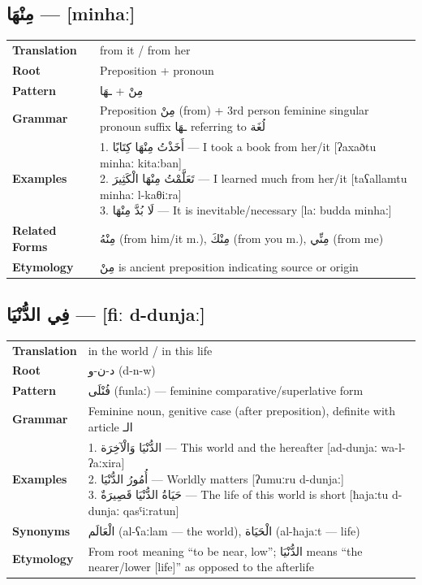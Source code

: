 \documentclass[letterpaper,12pt]{article}
\begin{document}
\subsection{\textarabic{مِنْهَا} — [minhaː]}
\begin{tabular}{p{3cm}p{10cm}}
\toprule
\textbf{Translation} & from it / from her \\
\textbf{Root} & Preposition + pronoun \\
\textbf{Pattern} & \textarabic{مِنْ} + \textarabic{ـهَا} \\
\textbf{Grammar} & Preposition \textarabic{مِنْ} (from) + 3rd person feminine singular pronoun suffix \textarabic{ـهَا} referring to \textarabic{لُغَة} \\
\midrule
\textbf{Examples} & \makecell[l]{\parbox{9.5cm}{
1. \textarabic{أَخَذْتُ مِنْهَا كِتَابًا} — I took a book from her/it [ʔaxaðtu minhaː kitaːban]\\
2. \textarabic{تَعَلَّمْتُ مِنْهَا الْكَثِيرَ} — I learned much from her/it [taʕallamtu minhaː l-kaθiːra]\\
3. \textarabic{لَا بُدَّ مِنْهَا} — It is inevitable/necessary [laː budda minhaː]
}} \\
\midrule
\textbf{Related Forms} & \textarabic{مِنْهُ} (from him/it m.), \textarabic{مِنْكَ} (from you m.), \textarabic{مِنِّي} (from me) \\
\textbf{Etymology} & \textarabic{مِنْ} is ancient preposition indicating source or origin \\
\bottomrule
\end{tabular}

\subsection{\textarabic{فِي الدُّنْيَا} — [fiː d-dunjaː]}
\begin{tabular}{p{3cm}p{10cm}}
\toprule
\textbf{Translation} & in the world / in this life \\
\textbf{Root} & \textarabic{د-ن-و} (d-n-w) \\
\textbf{Pattern} & \textarabic{فُنْلَى} (funlaː) — feminine comparative/superlative form \\
\textbf{Grammar} & Feminine noun, genitive case (after preposition), definite with article \textarabic{الـ} \\
\midrule
\textbf{Examples} & \makecell[l]{\parbox{9.5cm}{
1. \textarabic{الدُّنْيَا وَالْآخِرَة} — This world and the hereafter [ad-dunjaː wa-l-ʔaːxira]\\
2. \textarabic{أُمُورُ الدُّنْيَا} — Worldly matters [ʔumuːru d-dunjaː]\\
3. \textarabic{حَيَاةُ الدُّنْيَا قَصِيرَةٌ} — The life of this world is short [ħajaːtu d-dunjaː qasˤiːratun]
}} \\
\midrule
\textbf{Synonyms} & \textarabic{الْعَالَم} (al-ʕaːlam — the world), \textarabic{الْحَيَاة} (al-ħajaːt — life) \\
\textbf{Etymology} & From root meaning ``to be near, low''; \textarabic{الدُّنْيَا} means ``the nearer/lower [life]'' as opposed to the afterlife \\
\bottomrule
\end{tabular}
\end{document}
